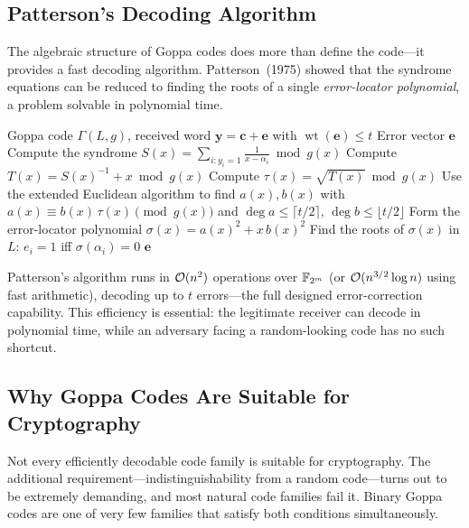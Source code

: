 \subsection{Patterson's Decoding Algorithm}
\label{subsec:patterson}

The algebraic structure of Goppa codes does more than define the code---it provides a fast decoding algorithm.  Patterson~(1975) showed that the syndrome equations can be reduced to finding the roots of a single \emph{error-locator polynomial}, a problem solvable in polynomial time.

\begin{algorithm}[t]
\caption{Patterson's Decoding Algorithm for Binary Goppa Codes}
\label{alg:patterson}
\begin{algorithmic}[1]
\Require Goppa code $\Gamma(L, g)$, received word $\mathbf{y} = \mathbf{c} + \mathbf{e}$ with $\operatorname{wt}(\mathbf{e}) \leq t$
\Ensure Error vector $\mathbf{e}$
\State Compute the syndrome $S(x) = \sum_{i: y_i = 1} \frac{1}{x - \alpha_i} \bmod g(x)$
\State Compute $T(x) = S(x)^{-1} + x \bmod g(x)$
\State Compute $\tau(x) = \sqrt{T(x)} \bmod g(x)$ 
\State Use the extended Euclidean algorithm to find $a(x), b(x)$ with $a(x) \equiv b(x)\,\tau(x) \pmod{g(x)}$ and $\deg a \leq \lceil t/2 \rceil$, $\deg b \leq \lfloor t/2 \rfloor$
\State Form the error-locator polynomial $\sigma(x) = a(x)^2 + x\,b(x)^2$
\State Find the roots of $\sigma(x)$ in $L$: $e_i = 1$ iff $\sigma(\alpha_i) = 0$
\State \Return $\mathbf{e}$
\end{algorithmic}
\end{algorithm}

Patterson's algorithm runs in $\mathcal{O}(n^2)$ operations over $\mathbb{F}_{2^m}$ (or $\mathcal{O}(n^{3/2} \log n)$ using fast arithmetic), decoding up to $t$ errors---the full designed error-correction capability.  This efficiency is essential: the legitimate receiver can decode in polynomial time, while an adversary facing a random-looking code has no such shortcut.


\subsection{Why Goppa Codes Are Suitable for Cryptography}
\label{subsec:goppa-crypto}

Not every efficiently decodable code family is suitable for cryptography.  The additional requirement---indistinguishability from a random code---turns out to be extremely demanding, and most natural code families fail it.  Binary Goppa codes are one of very few families that satisfy both conditions simultaneously.

